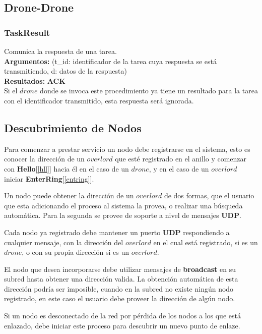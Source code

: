 \documentclass[a4paper,10pt]{article}
\begin{document}
	\pagebreak
	\subsection{Drone-Drone}
		\subsubsection{TaskResult}\label{tresult}
			Comunica la respuesta de una tarea.
			\\
			\textbf{Argumentos:} (t\_id: identificador de la tarea cuya respuesta se está transmitiendo, d: datos de la respuesta)\\
			\textbf{Resultados:} \textbf{ACK}\\
			
			Si el $drone$ donde se invoca este procedimiento ya tiene un resultado para la tarea con el identificador transmitido, esta respuesta será ignorada.
			
	\subsection{Descubrimiento de Nodos}
		Para comenzar a prestar servicio un nodo debe registrarse en el sistema, esto es conocer la dirección de un $overlord$ que esté registrado en el anillo y comenzar con \textbf{Hello}[\ref{hll}] hacia él en el caso de un $drone$, y en el caso de un $overlord$ iniciar \textbf{EnterRing}[\ref{entring}].
		 
		Un nodo puede obtener la dirección de un $overlord$ de dos formas, que el usuario que esta adicionando el proceso al sistema la provea, o realizar una búsqueda automática. Para la segunda se provee de soporte a nivel de mensajes \textbf{UDP}.
		
		Cada nodo ya registrado debe mantener un puerto \textbf{UDP} respondiendo a cualquier mensaje, con la dirección del $overlord$ en el cual está registrado, si es un $drone$, o con su propia dirección si es un $overlord$.
		
		El nodo que desea incorporarse debe utilizar mensajes de \textbf{broadcast} en su subred hasta obtener una dirección valida. La obtención automática de esta dirección podría ser imposible, cuando en la subred no existe ningún nodo registrado, en este caso el usuario debe proveer la dirección de algún nodo.
		
		Si un nodo es desconectado de la red por pérdida de los nodos a los que está enlazado, debe iniciar este proceso para descubrir un nuevo punto de enlaze.
		
\end{document}
